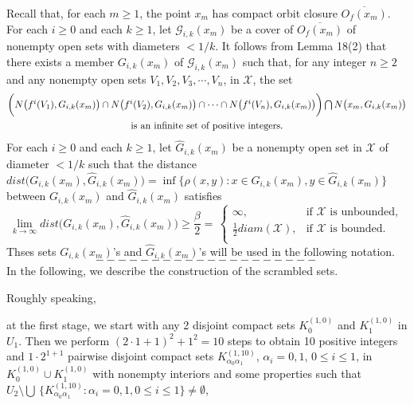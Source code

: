 \documentclass[12pt]{article}
\newcommand{\al}{\alpha}
\begin{document}
Recall that, for each $m \ge 1$, the point $x_m$ has compact orbit closure $\overline{O_f(x_m)}$.  For each $i \ge 0$ and each $k \ge 1$, let $\mathcal G_{i,k}(x_m)$ be a cover of $\overline{O_f(x_m)}$ of nonempty open sets with diameters $< 1/k$. It follows from Lemma 18(2) that there exists a member $G_{i,k}(x_m)$ of $\mathcal G_{i,k}(x_m)$ such that, for any integer $n \ge 2$ and any nonempty open sets $V_1, V_2, V_3, \cdots, V_n$, in $\mathcal X$, the set
\begin{multline*}
$$
\bigg(N\big(f^i(V_1), G_{i,k}(x_m)\big) \cap N\big(f^i(V_2), G_{i,k}(x_m)\big) \cap \cdots \cap N\big(f^i(V_n), G_{i,k}(x_m)\big)\bigg) \bigcap N\big(x_m, G_{i,k}(x_m)\big) \\ \text{is an infinite set of positive integers}.
$$
\end{multline*}
\indent For each $i \ge 0$ and each $k \ge 1$, let $\widehat G_{i,k}(x_m)$ be a nonempty open set in $\mathcal X$ of diameter $< 1/k$ such that the distance $dist\big(G_{i,k}(x_m), \widehat G_{i,k}(x_m)\big) = \inf\big\{ \rho(x, y): x \in G_{i,k}(x_m), y \in \widehat G_{i,k}(x_m) \big\}$ between $G_{i,k}(x_m)$ and $\widehat G_{i,k}(x_m)$ satisfies 
$$
\lim_{k \to \infty} dist\big(G_{i,k}(x_m), \widehat G_{i,k}(x_m)\big) \ge \frac {\beta}2 = \, \begin{cases}
                                                      \infty, & \text{if $\mathcal X$ is unbounded}, \\
                                                      \frac 12 diam(\mathcal X), & \text{if $\mathcal X$ is bounded}.\\
                                                      \end{cases}
$$
Thses sets $G_{i,k}(x_m)$'s and $\widehat G_{i,k}(x_m)$'s will be used in the following notation.        
$$--------------------$$
\indent In the following, we describe the construction of the scrambled sets.

Roughly speaking, 

at the first stage, we start with any 2 disjoint compact sets $K_0^{(1,0)}$ and $K_1^{(1,0)}$ in $U_1$.  Then we perform $(2 \cdot 1 +1)^2 + 1^2 = 10$ steps to obtain 10 positive integers and $1 \cdot 2^{1+1}$ pairwise disjoint compact sets $K_{\al_0\al_1}^{(1,10)}$, $\al_i = 0, 1$, $0 \le i \le 1$, in $K_0^{(1,0)} \cup K_1^{(1,0)}$ with nonempty interiors and some properties such that $U_2 \setminus \bigcup \, \{ K_{\al_0\al_1}^{(1,10)}: \al_i = 0, 1, 0 \le i \le 1 \} \ne \emptyset$,  
\end{document}

